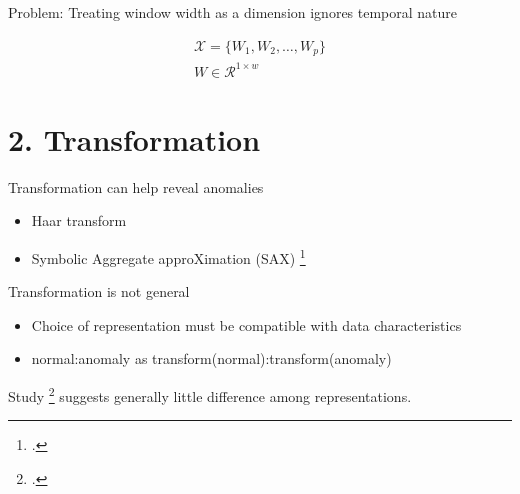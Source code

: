 \documentclass{beamer}
\begin{document}
  \begin{frame}{Problem: Treating window width as a dimension ignores temporal nature}

    \begin{gather*}
      \mathcal{X} =\{W_1,W_2,\ldots,W_p\}   \\
      W \in \mathcal{R}^{1 \times w}
    \end{gather*}
    
  \end{frame}






  \section{2. Transformation}


  \begin{frame}{Transformation can help reveal anomalies}

    \begin{itemize}
    \item Haar transform %
    \item Symbolic Aggregate approXimation (SAX) \footcite{Lin2007}
    \end{itemize}

  \end{frame}

  \begin{frame}{Transformation is not general}

    \begin{itemize}
    \item Choice of representation must be compatible with data characteristics  %
    \item normal:anomaly as transform(normal):transform(anomaly)
    \end{itemize}

    Study \footcite{Wang2013} suggests generally little difference among representations.

  \end{frame}
\end{document}
